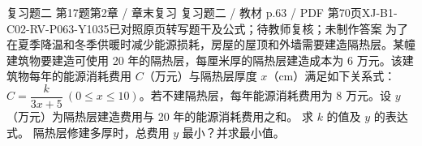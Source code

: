 \par\noindent\begin{minipage}{\linewidth}
\begin{bankitem}{复习题二 第17题}{第2章 / 章末复习 复习题二 / 教材 p.63 / PDF 第70页}{XJ-B1-C02-RV-P063-Y1035}{已对照原页转写题干及公式；待教师复核；未制作答案}
为了在夏季降温和冬季供暖时减少能源损耗，房屋的屋顶和外墙需要建造隔热层。某幢建筑物要建造可使用 20 年的隔热层，每厘米厚的隔热层建造成本为 6 万元。该建筑物每年的能源消耗费用 $C$（万元）与隔热层厚度 $x$（$\mathrm{cm}$）满足如下关系式：$C=\dfrac k{3x+5}\ (0\le x\le10)$。若不建隔热层，每年能源消耗费用为 8 万元。设 $y$（万元）为隔热层建造费用与 20 年的能源消耗费用之和。
求 $k$ 的值及 $y$ 的表达式。
隔热层修建多厚时，总费用 $y$ 最小？并求最小值。
\end{bankitem}
\end{minipage}\par\medskip
